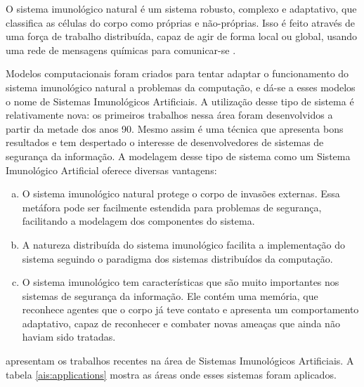 O sistema imunológico natural é um sistema robusto, complexo e adaptativo, que classifica as células do corpo como próprias e não-próprias. Isso é feito através de uma força de trabalho distribuída, capaz de agir de forma local ou global, usando uma rede de mensagens químicas para comunicar-se \cite{Aickelin2005}.

Modelos computacionais foram criados para tentar adaptar o funcionamento do sistema imunológico natural a problemas da computação, e dá-se a esses modelos o nome de Sistemas Imunológicos Artificiais. A utilização desse tipo de sistema é relativamente nova: os primeiros trabalhos nessa área foram desenvolvidos a partir da metade dos anos 90. Mesmo assim é uma técnica que apresenta bons resultados e tem despertado o interesse de desenvolvedores de sistemas de segurança da informação. A modelagem desse tipo de sistema como um Sistema Imunológico Artificial oferece diversas vantagens:

\begin{enumerate}[a)]
\item O sistema imunológico natural protege o corpo de invasões externas. Essa metáfora pode ser facilmente estendida para problemas de segurança, facilitando a modelagem dos componentes do sistema.
\item A natureza distribuída do sistema imunológico facilita a implementação do sistema seguindo o paradigma dos sistemas distribuídos da computação.
\item O sistema imunológico tem características que são muito importantes nos sistemas de segurança da informação. Ele contém uma memória, que reconhece agentes que o corpo já teve contato e apresenta um comportamento adaptativo, capaz de reconhecer e combater novas ameaças que ainda não haviam sido tratadas.
\end{enumerate}

\citet{Dasgupta2010} apresentam os trabalhos recentes na área de Sistemas Imunológicos Artificiais. A tabela \ref{ais:applications} mostra as áreas onde esses sistemas foram aplicados.

